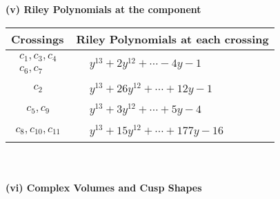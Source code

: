 \documentclass[1p]{elsarticle_modified}
\theoremstyle{definition}
\begin{document}
\newpage\renewcommand{\arraystretch}{1}
\flushleft \textbf{(v) Riley Polynomials at the component}\newline \\
\begin{tabular}{m{50pt}|m{274pt}}
Crossings & \hspace{64pt}Riley Polynomials at each crossing \\
\hline $$\begin{aligned}c_{1},c_{3},c_{4}\\c_{6},c_{7}\end{aligned}$$&$\begin{aligned}
&y^{13}+2 y^{12}+\cdots-4 y-1
\end{aligned}$\\
\hline $$\begin{aligned}c_{2}\end{aligned}$$&$\begin{aligned}
&y^{13}+26 y^{12}+\cdots+12 y-1
\end{aligned}$\\
\hline $$\begin{aligned}c_{5},c_{9}\end{aligned}$$&$\begin{aligned}
&y^{13}+3 y^{12}+\cdots+5 y-4
\end{aligned}$\\
\hline $$\begin{aligned}c_{8},c_{10},c_{11}\end{aligned}$$&$\begin{aligned}
&y^{13}+15 y^{12}+\cdots+177 y-16
\end{aligned}$\\
\hline
\end{tabular}\\~\\
\newpage\flushleft \textbf{(vi) Complex Volumes and Cusp Shapes}
\end{document}
